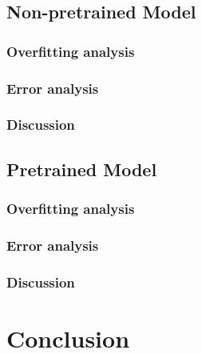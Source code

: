 \documentclass[8pt, a4]{article}
\begin{document}
	\subsection{Non-pretrained Model}
	\subsubsection{Overfitting analysis}
	\subsubsection{Error analysis}
	\subsubsection{Discussion}
	\subsection{Pretrained Model}
	\subsubsection{Overfitting analysis}
	\subsubsection{Error analysis}
	\subsubsection{Discussion}
	\section{Conclusion}
\end{document}
